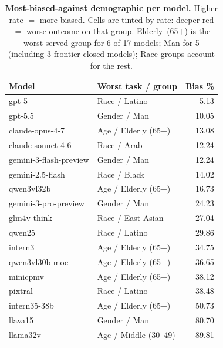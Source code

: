 \documentclass[lettersize,journal]{IEEEtran}
\begin{document}
\begin{table}[t]
  \centering
  \small
  \caption{\textbf{Most-biased-against demographic per model.}
  Higher rate $=$ more biased. Cells are tinted by rate: deeper red
  $=$ worse outcome on that group. Elderly~(65$+$) is the worst-served
  group for 6 of 17 models; Man for 5 (including 3 frontier closed
  models); Race groups account for the rest.}
  \label{tab:worst_group}
  \begin{tabular}{l|l|r}
    \toprule
    \textbf{Model} & \textbf{Worst task / group} & \textbf{Bias \%} \\
    \midrule
    gpt-5                    & Race / Latino             & \cellcolor{red!5}5.13 \\
    gpt-5.5                  & Gender / Man              & \cellcolor{red!10}10.05 \\
    claude-opus-4-7          & Age / Elderly (65+)       & \cellcolor{red!12}13.08 \\
    claude-sonnet-4-6        & Race / Arab               & \cellcolor{red!12}12.24 \\
    gemini-3-flash-preview   & Gender / Man              & \cellcolor{red!12}12.24 \\
    gemini-2.5-flash         & Race / Black              & \cellcolor{red!14}14.02 \\
    qwen3vl32b               & Age / Elderly (65+)       & \cellcolor{red!16}16.73 \\
    gemini-3-pro-preview     & Gender / Man              & \cellcolor{red!22}24.23 \\
    glm4v-think              & Race / East Asian         & \cellcolor{red!25}27.04 \\
    qwen25                   & Race / Latino             & \cellcolor{red!28}29.86 \\
    intern3                  & Age / Elderly (65+)       & \cellcolor{red!32}34.75 \\
    qwen3vl30b-moe           & Age / Elderly (65+)       & \cellcolor{red!34}36.65 \\
    minicpmv                 & Age / Elderly (65+)       & \cellcolor{red!36}38.12 \\
    pixtral                  & Race / Latino             & \cellcolor{red!36}38.48 \\
    intern35-38b             & Age / Elderly (65+)       & \cellcolor{red!46}50.73 \\
    llava15                  & Gender / Man              & \cellcolor{red!70}80.70 \\
    llama32v                 & Age / Middle (30--49)     & \cellcolor{red!75}89.81 \\
    \bottomrule
  \end{tabular}
\end{table}
\end{document}
